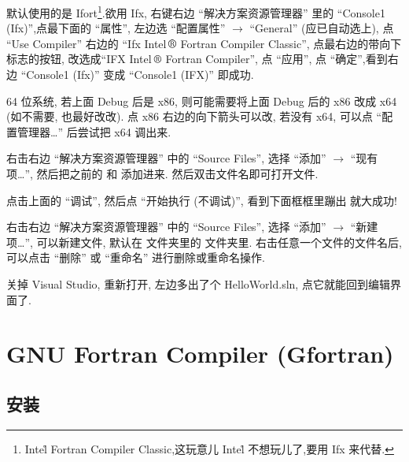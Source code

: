 默认使用的是 Ifort\footnote{Intel\r{} Fortran Compiler Classic,这玩意儿 Intel\r{} 不想玩儿了,要用 Ifx 来代替.}.欲用 Ifx, 右键右边 ``解决方案资源管理器'' 里的 ``Console1 (Ifx)'',点最下面的 ``属性'', 左边选 ``配置属性'' $\rightarrow$ ``General'' (应已自动选上), 点 ``Use Compiler'' 右边的 ``Ifx Intel$\,\text{\textregistered}$ Fortran Compiler Classic'', 点最右边的带向下标志的按钮, 改选成``IFX Intel$\,\text{\textregistered}$ Fortran Compiler'', 点 ``应用'', 点 ``确定'',看到右边 ``Console1 (Ifx)'' 变成 ``Console1 (IFX)'' 即成功.

64 位系统, 若上面 Debug 后是 x86, 则可能需要将上面 Debug 后的 x86 改成 x64 (如不需要, 也最好改改). 点 x86 右边的向下箭头可以改, 若没有 x64, 可以点 ``配置管理器\dots'' 后尝试把 x64 调出来.

右击右边 ``解决方案资源管理器'' 中的 ``Source Files'', 选择 ``添加'' $\rightarrow$ ``现有项\dots'', 然后把之前的  和  添加进来. 然后双击文件名即可打开文件.

点击上面的 ``调试'', 然后点 ``开始执行 (不调试)'', 看到下面框框里蹦出  就大成功!

右击右边 ``解决方案资源管理器'' 中的 ``Source Files'', 选择 ``添加'' $\rightarrow$ ``新建项\dots'', 可以新建文件, 默认在  文件夹里的  文件夹里. 右击任意一个文件的文件名后, 可以点击 ``删除'' 或 ``重命名'' 进行删除或重命名操作.

关掉 Visual Studio, 重新打开, 左边多出了个 HelloWorld.sln, 点它就能回到编辑界面了.

\section[GNU Fortran Compiler]{GNU Fortran Compiler (Gfortran)}

\subsection{安装}

